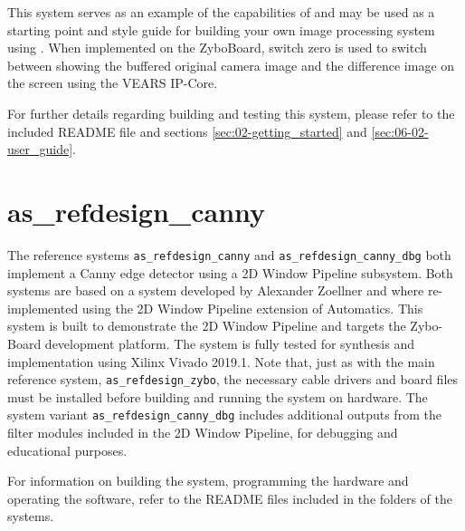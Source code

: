 This system serves as an example of the capabilities of \asterics and may be used as a starting point and style guide for building your own image processing system using \asterics.
When implemented on the ZyboBoard, switch zero is used to switch between showing the buffered original camera image and the difference image on the screen using the VEARS IP-Core.

For further details regarding building and testing this system, please refer to the included README file and sections \ref{sec:02-getting_started} and \ref{sec:06-02-user_guide}.


\section{as\_refdesign\_canny}
\label{sec:09-01-as_refdesign_canny}


The reference systems \texttt{as\_refdesign\_canny} and \texttt{as\_refdesign\_canny\_dbg} both implement a Canny edge detector using a 2D Window Pipeline subsystem.
Both systems are based on a system developed by Alexander Zoellner and where re-implemented using the 2D Window Pipeline extension of Automatics.
This system is built to demonstrate the 2D Window Pipeline and targets the Zybo-Board development platform.
The system is fully tested for synthesis and implementation using Xilinx Vivado 2019.1.
Note that, just as with the main reference system, \texttt{as\_refdesign\_zybo}, the necessary cable drivers and board files must be installed before building and running the system on hardware.
The system variant \texttt{as\_refdesign\_canny\_dbg} includes additional outputs from the filter modules included in the 2D Window Pipeline, for debugging and educational purposes.

For information on building the system, programming the hardware and operating the software, refer to the README files included in the folders of the systems.

